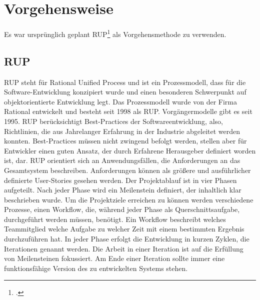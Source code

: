\chapter{Vorgehensweise}
\reiter
Es war ursprünglich geplant RUP\footcite{Lehrunterlagen-RUP} als Vorgehensmethode zu verwenden. 
\section{RUP}
RUP steht für Rational Unified Process und ist ein Prozessmodell, dass für die Software-Entwicklung konzipiert wurde und einen besonderen Schwerpunkt auf objektorientierte Entwicklung legt. Das Prozessmodell wurde von der Firma Rational entwickelt und besteht seit 1998 als RUP. Vorgängermodelle gibt es seit 1995. 
RUP berücksichtigt Best-Practices der Softwareentwicklung, also, Richtlinien, die aus Jahrelanger Erfahrung in der Industrie abgeleitet werden konnten. Best-Practices müssen nicht zwingend befolgt werden, stellen aber für Entwickler einen guten Ansatz, der durch Erfahrene Herausgeber definiert worden ist, dar. 
RUP orientiert sich an Anwendungsfällen, die Anforderungen an das Gesamtsystem beschreiben. Anforderungen können als größere und ausführlicher definierte User-Stories gesehen werden.  
Der Projektablauf ist in vier Phasen aufgeteilt. Nach jeder Phase wird ein Meilenstein definiert, der inhaltlich klar beschrieben wurde.
Um die Projektziele erreichen zu können werden verschiedene Prozesse, einen Workflow, die, während jeder Phase als Querschnittsaufgabe, durchgeführt werden müssen, benötigt. Ein Workflow beschreibt welches Teammitglied welche Aufgabe zu welcher Zeit mit einem bestimmten Ergebnis durchzuführen hat.
In jeder Phase erfolgt die Entwicklung in kurzen Zyklen, die Iterationen genannt werden. Die Arbeit in einer Iteration ist auf die Erfüllung von Meilensteinen fokussiert. Am Ende einer Iteration sollte immer eine funktionsfähige Version des zu entwickelten Systems stehen.
\newpage
